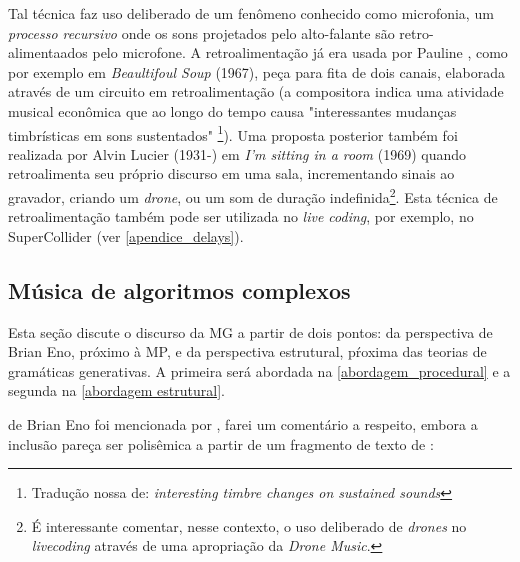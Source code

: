Tal técnica faz uso deliberado de um fenômeno conhecido como microfonia, um \emph{processo recursivo} onde os sons projetados pelo alto-falante são retro-alimentaados pelo microfone. A retroalimentação já era usada por Pauline , como por exemplo em \emph{Beaultifoul Soup} (1967), peça para fita de dois canais, elaborada através de um circuito em retroalimentação (a compositora indica uma atividade musical econômica que ao longo do tempo causa "interessantes mudanças timbrísticas em sons sustentados" \footnote{ Tradução nossa de: \emph{interesting timbre changes on sustained sounds}}). Uma proposta posterior também foi realizada por Alvin Lucier (1931-) em \emph{I'm sitting in a room} (1969) quando retroalimenta seu próprio discurso em uma sala, incrementando sinais ao gravador, criando um \emph{drone}, ou um som de duração indefinida\footnote{É interessante comentar, nesse contexto, o uso deliberado de \emph{drones} no \emph{livecoding} através de uma apropriação da \emph{Drone Music}.}. Esta técnica de retroalimentação também pode ser utilizada no \emph{live coding}, por exemplo, no SuperCollider (ver \autoref{apendice_delays}).

\subsection{Música de algoritmos complexos}\label{sec:alg_complexo}

Esta seção discute o discurso da MG a partir de dois pontos: da perspectiva de Brian Eno, próximo à MP, e da perspectiva estrutural, pŕoxima das teorias de gramáticas generativas. A primeira será abordada na \autoref{abordagem_procedural} e a segunda na \autoref{abordagem estrutural}.
 
de Brian Eno foi mencionada por , farei um comentário a respeito, embora a inclusão pareça ser polisêmica a partir de um fragmento de texto de :

